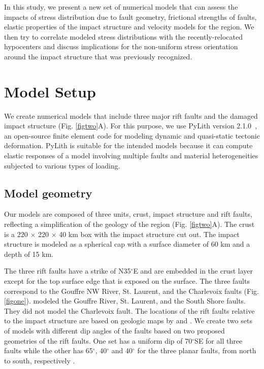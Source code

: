 \documentclass[draft]{agujournal2018}
\begin{document}
In this study, we present a new set of numerical models that can assess the impacts of stress distribution due to fault geometry, frictional strengths of faults, elastic properties of the impact structure and velocity models for the region. We then try to correlate modeled stress distributions with the recently-relocated hypocenters \citep{Powell_2017} and discuss implications for the non-uniform stress orientation around the impact structure that was previously recognized.

\section{Model Setup}
We create numerical models that include three major rift faults and the damaged impact structure (Fig. \ref{figtwo}A). For this purpose, we use PyLith version 2.1.0~\citep{Aagard2015, matthew2015, c2015}, an open-source finite element code for modeling dynamic and quasi-static tectonic deformation. PyLith is suitable for the intended models because it can compute elastic responses of a model involving multiple faults and material heterogeneities subjected to various types of loading.

\subsection{Model geometry}
Our models are composed of three units, crust, impact structure and rift faults, reflecting a simplification of the geology of the region (Fig. \ref{figtwo}A). The crust is a 220 $\times$ 220 $\times$ 40 km box with the impact structure cut out. The impact structure is modeled as a spherical cap with a surface diameter of 60 km and a depth of 15 km. 

The three rift faults have a strike of N35$^\circ$E and are embedded in the crust layer except for the top surface edge that is exposed on the surface. The three faults correspond to the Gouffre NW River, St. Laurent, and the Charlevoix faults (Fig. \ref{figone}). \citet{Baird_2010} modeled the Gouffre River, St. Laurent, and the South Shore faults. They did not model the Charlevoix fault. The locations of the rift faults relative to the impact structure are based on geologic maps by \citet{lamontagne1999} and \citet{Rondot_1971}. We create two sets of models with different dip angles of the faults based on two proposed geometries of the rift faults. One set has a uniform dip of 70$^\circ$SE for all three faults \citep{anglin1984,Baird_2010} while the other has 65$^\circ$, 40$^\circ$ and 40$^\circ$ for the three planar faults, from north to south, respectively \citep{Powell_2017}. 
\end{document}
